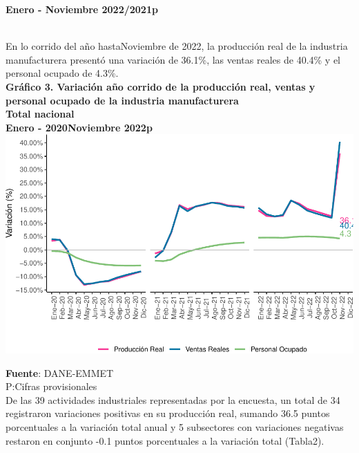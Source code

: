 \documentclass[
]{article}
\begin{document}
\textbf{Enero - Noviembre 2022/2021p}\\
\strut \\

En lo corrido del año hastaNoviembre de 2022, la producción real de la
industria manufacturera presentó una variación de 36.1\%, las ventas
reales de 40.4\% y el personal ocupado de 4.3\%.\\

\textbf{Gráfico 3. Variación año corrido de la producción real, ventas y
personal ocupado de la industria manufacturera}\\
\textbf{Total nacional}\\
\textbf{Enero - 2020Noviembre 2022p}\\

\includegraphics{boletin_files/figure-latex/anio_corrido_view-1.pdf}

\textbf{Fuente}: DANE-EMMET\\
P:Cifras provisionales\\

De las 39 actividades industriales representadas por la encuesta, un
total de 34 registraron variaciones positivas en su producción real,
sumando 36.5 puntos porcentuales a la variación total anual y 5
subsectores con variaciones negativas restaron en conjunto -0.1 puntos
porcentuales a la variación total (Tabla2).
\end{document}
